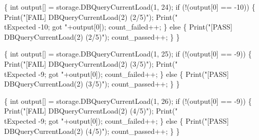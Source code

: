 \documentclass{article}
\def\nwendcode{\endtrivlist \endgroup}
\let\nwdocspar=\par
\theoremstyle{definition}
\begin{document}
\{
  int output[] = storage.DBQueryCurrentLoad(1, 24);
  if (!(output[0] == -10)) \{
    Print("[FAIL] DBQueryCurrentLoad(2) (2/5)");
    Print("\\tExpected -10; got "+output[0]);
    count_failed++;
  \} else \{
    Print("[PASS] DBQueryCurrentLoad(2) (2/5)");
    count_passed++;
  \}
\}
\nwendcode{}\nwdocspar
\nwenddocs{}\endmoddef{}
\{
  int output[] = storage.DBQueryCurrentLoad(1, 25);
  if (!(output[0] == -9)) \{
    Print("[FAIL] DBQueryCurrentLoad(2) (3/5)");
    Print("\\tExpected -9; got "+output[0]);
    count_failed++;
  \} else \{
    Print("[PASS] DBQueryCurrentLoad(2) (3/5)");
    count_passed++;
  \}
\}
\nwendcode{}\nwdocspar
\nwenddocs{}\endmoddef{}
\{
  int output[] = storage.DBQueryCurrentLoad(1, 26);
  if (!(output[0] == -9)) \{
    Print("[FAIL] DBQueryCurrentLoad(2) (4/5)");
    Print("\\tExpected -9; got "+output[0]);
    count_failed++;
  \} else \{
    Print("[PASS] DBQueryCurrentLoad(2) (4/5)");
    count_passed++;
  \}
\}
\nwendcode{}\nwdocspar
\end{document}
